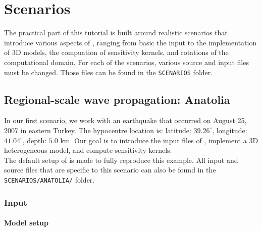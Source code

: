 \chapter{Scenarios}

The practical part of this tutorial is built around realistic scenarios that introduce various aspects of \SES, ranging from basic the input to the implementation of 3D models, the compuation of sensitivity kernels, and rotations of the computational domain. For each of the scenarios, various source and input files must be changed. Those files can be found in the \texttt{SCENARIOS} folder.


\section{Regional-scale wave propagation: Anatolia}\label{S:Anatolia}

In our first scenario, we work with an earthquake that occurred on August 25, 2007 in eastern Turkey. The hypocentre location is: latitude: $39.26^\circ$, longitude: $41.04^\circ$, depth: $5.0$ km. Our goal is to introduce the input files of \SES, implement a 3D heterogeneous model, and compute sensitivity kernels.\\[5pt]
The default setup of \SES is made to fully reproduce this example. All input and source files that are specific to this scenario can also be found in the \texttt{SCENARIOS/ANATOLIA/} folder.


\subsection{Input}

\subsubsection{Model setup}\label{S:model_setup}

